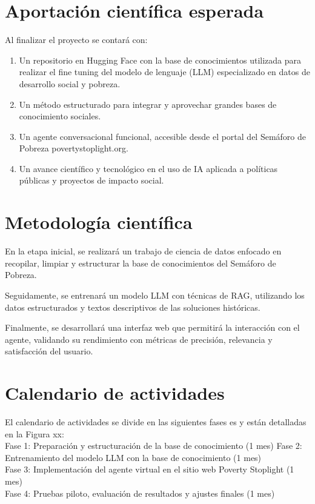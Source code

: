 \documentclass{article}
\begin{document}
\section{Aportación científica esperada}\label{sec:aporte}
Al finalizar el proyecto se contará con:
\begin{enumerate}
\item Un repositorio en Hugging Face con la base de conocimientos utilizada para realizar el fine tuning del modelo de lenguaje (LLM) especializado en datos de desarrollo social y pobreza.
\item Un método estructurado para integrar y aprovechar grandes bases de conocimiento sociales.
\item Un agente conversacional funcional, accesible desde el portal del Semáforo de Pobreza povertystoplight.org.
\item Un avance científico y tecnológico en el uso de IA aplicada a políticas públicas y proyectos de impacto social.
\end{enumerate}

\section{Metodología científica}\label{metodologia}
En la etapa inicial, se realizará un trabajo de ciencia de datos enfocado en recopilar, limpiar y estructurar la base de conocimientos del Semáforo de Pobreza.

Seguidamente, se entrenará un modelo LLM con técnicas de RAG, utilizando los datos estructurados y textos descriptivos de las soluciones históricas.

Finalmente, se desarrollará una interfaz web que permitirá la interacción con el agente, validando su rendimiento con métricas de precisión, relevancia y satisfacción del usuario.

\section{Calendario de actividades}\label{sec:calendario}
El calendario de actividades se divide en las siguientes fases es y están detalladas en la Figura xx:\\

Fase 1: Preparación y estructuración de la base de conocimiento (1 mes)
Fase 2: Entrenamiento del modelo LLM con la base de conocimiento (1 mes)\\
Fase 3: Implementación del agente virtual en el sitio web Poverty Stoplight (1 mes)\\
Fase 4: Pruebas piloto, evaluación de resultados y ajustes finales (1 mes)\\
\end{document}
